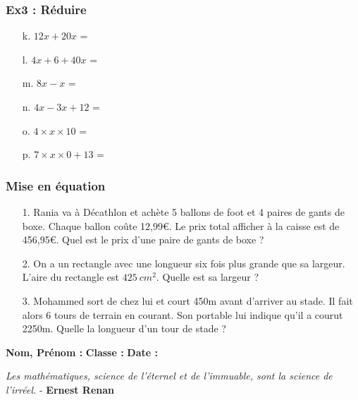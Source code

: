 \subsubsection*{Ex3 : Réduire}

\begin{enumerate}
  \item[k.] $12x + 20x$ = \dotfill 
  \item[l.] $4x + 6 + 40x$ = \dotfill 
  \item[m.] $8x - x$ = \dotfill 
  \item[n.] $4x - 3x + 12$ = \dotfill 
  \item[o.] $4 \times x \times 10$ = \dotfill 
  \item[p.] $7 \times x \times 0 + 13$ = \dotfill 
\end{enumerate}

\subsubsection*{Mise en équation}

\begin{enumerate}
  \item[1.] Rania va à Décathlon et achète 5 ballons de foot et 4 paires de gants de boxe. Chaque ballon coûte 12,99€. Le prix total afficher à la caisse est de 456,95€. Quel est le prix d'une paire de gants de boxe ?

  \item[2.] On a un rectangle avec une longueur six fois plus grande que sa largeur. L'aire du rectangle est $\SI{425}{cm^2}$. Quelle est sa largeur ?

  \item[3.] Mohammed sort de chez lui et court 450m avant d'arriver au stade. Il fait alors 6 tours de terrain en courant. Son portable lui indique qu'il a courut 2250m. Quelle la longueur d'un tour de stade ?
\end{enumerate}

\newpage

\textbf{Nom, Prénom :} \hspace{8cm} \textbf{Classe :} \hspace{3cm} \textbf{Date :}\\

\begin{center}
  \textit{Les mathématiques, science de l’éternel et de l’immuable, sont la science de l’irréel.}  - \textbf{Ernest Renan}
\end{center}

